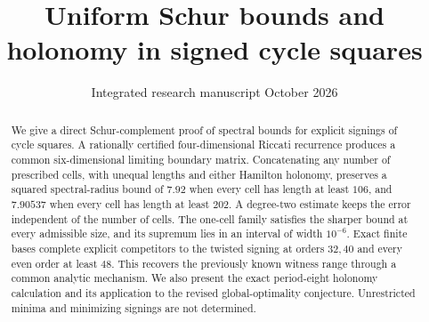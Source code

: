 \documentclass[11pt]{article}
\title{Uniform Schur bounds and holonomy in signed cycle squares}
\author{}
\date{Integrated research manuscript\quad 5 October 2026}
\theoremstyle{remark}\newtheorem{remark}[theorem]{Remark}
\begin{document}
\maketitle
\begin{abstract}
We give a direct Schur-complement proof of spectral bounds for explicit
signings of cycle squares. A rationally certified four-dimensional Riccati
recurrence produces a common six-dimensional limiting boundary matrix.
Concatenating any number of prescribed cells, with unequal lengths and
either Hamilton holonomy, preserves a squared spectral-radius bound of
$7.92$ when every cell has length at least $106$, and $7.90537$ when every
cell has length at least $202$. A degree-two estimate keeps the error
independent of the number of cells. The one-cell family satisfies the
sharper bound at every admissible size, and its supremum lies in an interval
of width $10^{-6}$. Exact finite bases complete explicit competitors to the
twisted signing at orders $32,40$ and every even order at least $48$.
This recovers the previously known witness range through a common analytic
mechanism. We also present the exact period-eight holonomy calculation and
its application to the revised global-optimality conjecture. Unrestricted
minima and minimizing signings are not determined.
\end{abstract}








\end{document}
